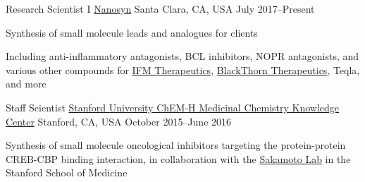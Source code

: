 

\begin{cventries}
	

	\cventry
	{Research Scientist I} %
	{\href{http://nanosyn.com/}{Nanosyn}} %
	{Santa Clara, CA, USA} %
	{July 2017--Present} %
	{
		\begin{cvitems} %
			\item {Synthesis of small molecule leads and analogues for clients}
			\item {Including anti-inflammatory antagonists, BCL inhibitors, NOPR antagonists, and various other compounds for \href{http://www.ifmthera.com/}{IFM Therapeutics}, \href{http://www.blackthornrx.com/}{BlackThorn Therapeutics}, Teqla, and more}
		\end{cvitems}
	}
	
	\cventry
	{Staff Scientist} %
	{\href{https://chemh.stanford.edu/knowledge-centers/medicinal-chemistry-knowledge-center}{Stanford University ChEM-H Medicinal Chemistry Knowledge Center}} %
	{Stanford, CA, USA} %
	{October 2015--June 2016} %
	{
		\begin{cvitems} %
			\item {Synthesis of small molecule oncological inhibitors targeting the protein-protein CREB-CBP binding interaction, in collaboration with the \href{http://sakamotolab.com/index.htm}{Sakamoto Lab} in the Stanford School of Medicine}
		\end{cvitems}
	}
	
\end{cventries}